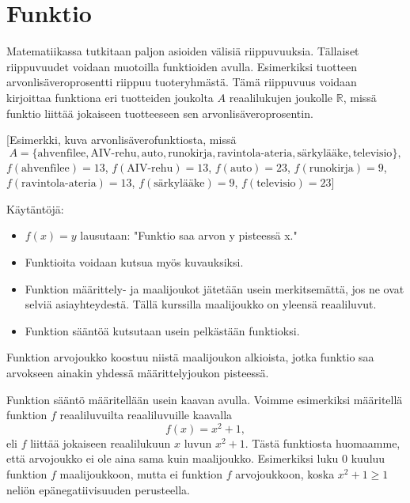 \chapter{Funktio}

Matematiikassa tutkitaan paljon asioiden välisiä riippuvuuksia. Tällaiset riippuvuudet voidaan muotoilla funktioiden avulla. Esimerkiksi tuotteen arvonlisäveroprosentti riippuu tuoteryhmästä. Tämä riippuvuus voidaan kirjoittaa funktiona eri tuotteiden joukolta $A$ reaalilukujen joukolle $\mathbb{R}$, missä funktio liittää jokaiseen tuotteeseen sen arvonlisäveroprosentin.

[Esimerkki, kuva arvonlisäverofunktiosta, missä \[A = \{\text{ahvenfilee}, \text{AIV-rehu}, \text{auto}, \text{runokirja}, \text{ravintola-ateria}, \text{särkylääke}, \text{televisio}\},\]$f(\text{ahvenfilee}) = 13$, $f(\text{AIV-rehu}) = 13$, $f(\text{auto}) = 23$, $f(\text{runokirja}) = 9$, $f(\text{ravintola-ateria}) = 13$, $f(\text{särkylääke}) = 9$, $f(\text{televisio}) = 23$]


Käytäntöjä:
\begin{itemize}
\item $f(x) = y$ lausutaan: "Funktio saa arvon y pisteessä x."
\item Funktioita voidaan kutsua myös kuvauksiksi.
\item Funktion määrittely- ja maalijoukot jätetään usein merkitsemättä, jos ne ovat selviä asiayhteydestä. Tällä kurssilla maalijoukko on yleensä reaaliluvut.
\item Funktion sääntöä kutsutaan usein pelkästään funktioksi.
\end{itemize}

Funktion arvojoukko koostuu niistä maalijoukon alkioista, jotka funktio saa arvokseen ainakin yhdessä määrittelyjoukon pisteessä.

Funktion sääntö määritellään usein kaavan avulla. Voimme esimerkiksi määritellä funktion $f$ reaaliluvuilta reaaliluvuille kaavalla
\[f(x) = x^2 + 1,\]
eli $f$ liittää jokaiseen reaalilukuun $x$ luvun $x^2+1$. Tästä funktiosta huomaamme, että arvojoukko ei ole aina sama kuin maalijoukko. Esimerkiksi luku $0$ kuuluu funktion $f$ maalijoukkoon, mutta ei funktion $f$ arvojoukkoon, koska $x^2+1\geq 1$ neliön epänegatiivisuuden perusteella.

